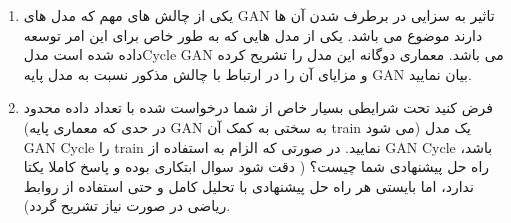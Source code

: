 

\begin{enumerate}[label=(\alph*)]
	
	\item
	یکی از چالش های مهم که مدل های GAN تاثیر به سزایی در برطرف شدن آن ها دارند موضوع  می باشد. یکی از مدل هایی که به طور خاص برای این امر توسعه داده شده است مدلCycle  GAN می باشد. معماری دوگانه این مدل را تشریح کرده و مزایای آن را در ارتباط با چالش مذکور نسبت به مدل پایه GAN بیان نمایید.
	
	\item
	فرض کنید تحت شرایطی بسیار خاص از شما درخواست شده با تعداد داده محدود (در حدی که معماری پایه GAN به سختی به کمک آن train می شود) یک مدل GAN Cycle را train نمایید. در صورتی که الزام به استفاده از GAN Cycle باشد، راه حل پیشنهادی شما چیست؟ ( دقت شود سوال ابتکاری بوده و پاسخ کاملا یکتا ندارد، اما بایستی هر راه حل پیشنهادی با تحلیل کامل و حتی استفاده از روابط ریاضی در صورت نیاز تشریح گردد).
	
\end{enumerate}